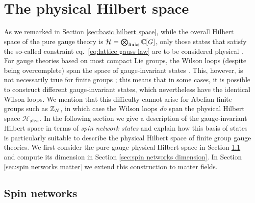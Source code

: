 \section{The physical Hilbert space}\label{sec:physical Hilbert space}

As we remarked in Section \ref{sec:basic hilbert space}, while the overall Hilbert space of the pure gauge theory is $\mathcal{H} = \bigotimes_{\mathrm{links}} \mathbb{C}[G]$, only those states that satisfy the so-called  constraint eq.~\eqref{eq:lattice gauss law} are to be considered physical \cite{KogSuss, Osborne, Tong}.
For gauge theories based on most compact Lie groups, the Wilson loops (despite being overcomplete) span the space of gauge-invariant states \cite{Sengupta, Durhuus}.
This, however, is not necessarily true for finite groups \cite{Sengupta, Cui}; this means that in some cases, it is possible to construct different gauge-invariant states, which nevertheless have the identical Wilson loops.
We mention that this difficulty cannot arise for Abelian finite groups such as $\mathbb{Z}_N$, in which case the Wilson loops \textit{do} span the physical Hilbert space $\mathcal{H}_{\mathrm{phys}}$.
In the following section we give a description of the gauge-invariant Hilbert space in terms of \textit{spin network states} and explain how this basis of states is particularly suitable to describe the physical Hilbert space of finite group gauge theories.
We first consider the pure gauge physical Hilbert space in Section \ref{sec:spin networks pure gauge} and compute its dimension in Section \ref{sec:spin networks dimension}.
In Section \ref{sec:spin networks matter} we extend this construction to matter fields.

\subsection{Spin networks}\label{sec:spin networks pure gauge}

